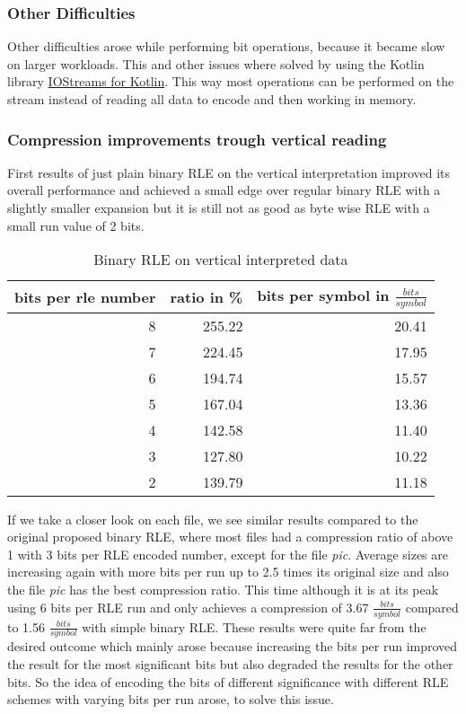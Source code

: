 \subsubsection{Other Difficulties}
\par{
Other difficulties arose while performing bit operations, because it became slow on larger workloads. This and other issues where solved by using the Kotlin library  \href{https://discuss.kotlinlang.org/t/i-o-streams-for-kotlin/9802}{IOStreams for Kotlin}}. This way most operations can be performed on the stream instead of reading all data to encode and then working in memory.

\subsubsection{Compression improvements trough vertical reading}
\par{
First results of just plain binary RLE on the vertical interpretation improved its overall performance and achieved a small edge over regular binary RLE with a slightly smaller expansion but it is still not as good as byte wise RLE with a small run value of 2 bits.
\begin{table}[H]
	\centering
	\begin{tabular}{r|r|r}	
		bits per rle number & ratio in \% & bits per symbol in $\frac{bits}{symbol}$\\
		\hline
		8 & 255.22 & 20.41\\
		7 & 224.45 & 17.95\\
		6 & 194.74 & 15.57\\
		5 & 167.04 & 13.36\\
		4 & 142.58 & 11.40\\
		3 & 127.80 & 10.22\\
		2 & 139.79 & 11.18 \\
	\end{tabular}
	\caption{Binary RLE on vertical interpreted data}
	\label{tab:t30 binary RLE on vertical interpreted data}
\end{table}
}

\par{
If we take a closer look on each file, we see similar results compared to the original proposed binary RLE, where most files had a compression ratio of above 1 with 3 bits per RLE encoded number, except for the file \textit{pic}. Average sizes are increasing again with more bits per run up to 2.5 times its original size and also the file \textit{pic} has the best compression ratio. This time although it is at its peak using 6 bits per RLE run and only achieves a compression of 3.67 $\frac{bits}{symbol}$ compared to 1.56 $\frac{bits}{symbol}$ with simple binary RLE. These results were quite far from the desired outcome which mainly arose because increasing the bits per run improved the result for the most significant bits but also degraded the results for the other bits. So the idea of encoding the bits of different significance with different RLE schemes with varying bits per run arose, to solve this issue.  
}

